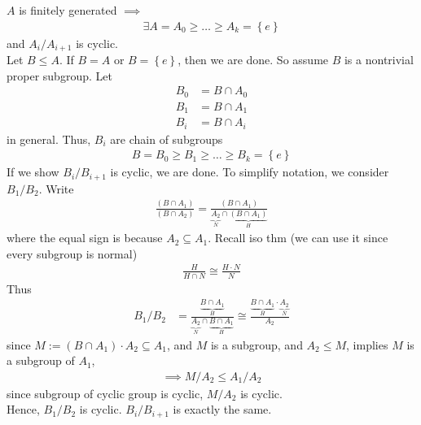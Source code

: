 \documentclass{article}
\begin{document}
\begin{homeworkProblem}
    $A$ is finitely generated $\implies$ 
    \begin{align}
        \exists A = A_0 \geq \ldots \geq A_k = \left\{ e \right\}
    \end{align}
    and $A_i / A_{i+1}$ is cyclic.\\
    Let $B \leq A$. If $B=A$ or $B= \left\{ e\right\}$,
    then we are done. So assume $B$ 
    is a nontrivial proper subgroup. Let
    \begin{align}
        B_0 &= B \cap A_0\\
        B_1 &= B \cap A_1\\
        B_i &= B \cap A_i
    \end{align}
    in general.
    Thus, $B_i$ are chain of subgroups
    \begin{align}
        B = B_0 \geq B_1 \geq \ldots \geq B_k = \left\{ e\right\}
    \end{align}
    If we show $B_i / B_{i+1}$ is cyclic,
    we are done. To simplify notation, 
    we consider $B_1/ B_2$. Write
    \begin{align}
        \frac{ (B \cap A_1) }{ (B \cap A_2) } = \frac{ (B \cap A_1) }{ \underbrace{A_2}_{N} \cap \underbrace{(B \cap A_1)}_{H} }  
    \end{align}
    where the equal sign is because $A_2 \subseteq A_1$.
    Recall iso thm (we can use it since every subgroup is normal)
    \begin{align}
        \frac{ H }{ H \cap N } \cong \frac{ H \cdot N }{ N }
    \end{align}
    Thus
    \begin{align}
        B_1/B_2 &= \frac{ \underbrace{B \cap A_1 }_{H} }{ \underbrace{A_2}_{N} \cap \underbrace{B \cap A_1}_{H}  } 
        \cong \frac{ \underbrace{B \cap A_1}_{H} \cdot \underbrace{A_2}_{N} }{ A_2 }
    \end{align}
    since $M := (B \cap A_1)\cdot A_2 \subseteq A_1$,
    and $M$ is a subgroup, and $A_2 \leq M$, implies 
    $M$ is a subgroup of $A_1$,
    \begin{align}
        \implies M / A_2 \leq A_1 / A_2
    \end{align}
    since subgroup of cyclic group is cyclic, $M / A_2$ is cyclic.\\
    Hence, $B_1 / B_2$ is cyclic. $B_i / B_{i+1}$ is exactly the same.\\
    
    
    

\end{homeworkProblem}
\end{document}
